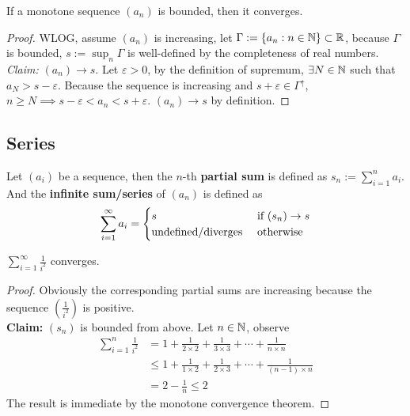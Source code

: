 \documentclass[11pt]{article}
\begin{document}
	\begin{theorem}
		If a monotone sequence $(a_n)$ is bounded, then it converges.
	\end{theorem}
	
	\begin{proof}
		WLOG, assume $(a_n)$ is increasing, let $\Gamma := \{a_n: n \in \mathbb{N}\} \subset \mathbb{R}$, because $\Gamma$ is bounded, $s := \sup_n \Gamma$ is well-defined by the completeness of real numbers.\\
		\emph{Claim:} $(a_n) \to s$. Let $\varepsilon > 0$, by the definition of supremum, $\exists N \in \mathbb{N}$ such that $a_N > s - \varepsilon$. Because the sequence is increasing and $s + \varepsilon \in \Gamma^\uparrow$, $n \geq N \implies s - \varepsilon < a_n  < s + \varepsilon$. $(a_n) \to s$ by definition.
	\end{proof}
	
	\subsection{Series}
	\begin{definition}
		Let $(a_i)$ be a sequence, then the $n$-th \textbf{partial sum} is defined as $s_n := \sum_{i=1}^n a_i$. And the \textbf{infinite sum/series} of $(a_n)$ is defined as 
		\begin{align}
			\sum_{i=1}^\infty a_i
			= \begin{cases}
				s &\text{{ if }} (s_n) \to s \\
				\text{{undefined/diverges}} &\text{{ otherwise}}
			\end{cases}
		\end{align}
	\end{definition}
	
	\begin{example}
		$\sum_{i=1}^\infty \frac{1}{i^2}$ converges.
	\end{example}
	
	\begin{proof}
		Obviously the corresponding partial sums are increasing because the sequence $(\frac{1}{i^2})$ is positive. \\
		\textbf{Claim:} $(s_n)$ is bounded from above. Let $n \in \mathbb{N}$, observe
		\begin{align}
			\sum_{i=1}^n \frac{1}{i^2} &= 1 + \frac{1}{2 \times 2} + \frac{1}{3 \times 3} + \cdots + \frac{1}{n \times n} \\
			&\leq 1 + \frac{1}{1 \times 2} + \frac{1}{2 \times 3} + \cdots + \frac{1}{(n-1) \times n} \\
			&= 2 - \frac{1}{n} \leq 2
		\end{align}
		The result is immediate by the monotone convergence theorem.
	\end{proof}
	
\end{document}
